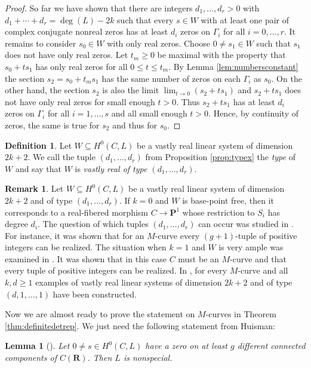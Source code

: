 \documentclass[12pt]{amsart}
\newcounter{conj}
\newcounter{thmcounter}
\numberwithin{equation}{section}
\numberwithin{thmcounter}{section}
\newtheorem{lemma}[thmcounter]{Lemma}
\theoremstyle{definition}
\newtheorem{definition}[thmcounter]{Definition}
\newtheorem{remark}[thmcounter]{Remark}
\theoremstyle{claim}
\newcommand{\nR}{\mathbf{R}}
\newcommand{\nP}{\mathbf{P}}
\begin{document}
\begin{proof}
\noindent So far we have shown that there are integers $d_1,\ldots,d_r>0$ with $d_1+\cdots+d_r=\deg(L)-2k$ such that every $s\in W$ with at least one pair of complex conjugate nonreal zeros has at least $d_i$ zeros on $\Gamma_i$ for all $i=0,\ldots,r$.
  It remains to consider $s_0\in W$ with only real zeros. Choose $0\neq s_1\in W$ such that $s_1$ does not have only real zeros.
 Let $t_m\geq0$ be maximal with the property that $s_0+ts_1$ has only real zeros for all $0\leq t\leq t_m$. By Lemma \ref{lem:numbersconstant} the section $s_2=s_0+t_ms_1$ has the same number of zeros on each $\Gamma_i$ as $s_0$. On the other hand, the section $s_2$ is also the limit $\lim_{t\to0}(s_2+ts_1)$ and $s_2+ts_1$ does not have only real zeros for small enough $t>0$. Thus $s_2+ts_1$ has at least $d_i$ zeros on $\Gamma_i$ for all $i=1,\ldots,s$ and all small enough $t>0$. Hence, by continuity of zeros, the same is true for $s_2$ and thus for $s_0$.
 \end{proof}

\begin{definition}
Let $W\subseteq H^0(C,L)$ be a vastly real linear system of dimension $2k+2$. We call the tuple $(d_1,\ldots,d_r)$ from Proposition \ref{prop:typex} the \emph{type} of $W$ and say that $W$ is \emph{vastly real of type $(d_1,\ldots,d_r)$}.
\end{definition}

\begin{remark}
    Let $W\subseteq H^0(C,L)$ be a vastly real linear system of dimension $2k+2$ and of type $(d_1,\ldots,d_r)$. If $k=0$ and $W$ is base-point free, then it corresponds to a real-fibered morphism $C\to\nP^1$ whose restriction to $S_i$ has degree $d_i$. The question of which tuples $(d_1,\ldots,d_r)$ can occur was studied in \cite{kumshaw}. For instance, it was shown that for an $M$-curve every $(g+1)$-tuple of positive integers can be realized. The situation when $k=1$ and $W$ is very ample was examined in \cite{mikhalkinorevkov}. It was shown that in this case $C$ must be an $M$-curve and that every tuple of positive integers can be realized. In \cite{kummersinn}, for every $M$-curve and all $k,d\geq1$ examples of vastly real linear systems of dimension $2k+2$ and of type $(d,1,\ldots,1)$ have been constructed.
\end{remark}

Now we are almost ready to prove the statement on $M$-curves in Theorem \ref{thm:definitedetrep}. We just need the following statement from Huisman:

\begin{lemma}[{\cite[Theorem 2.4]{huismannsd1}}]\label{lem:huisman}
	Let $0\neq s\in H^0(C,L)$ have a zero on at least $g$ different connected components of $C(\nR)$. Then $L$ is nonspecial.
\end{lemma}
\end{document}
